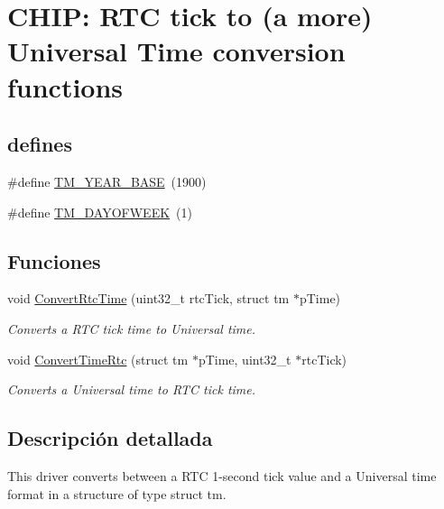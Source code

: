 \hypertarget{group___r_t_c___u_t}{}\section{C\+H\+IP\+: R\+TC tick to (a more) Universal Time conversion functions}
\label{group___r_t_c___u_t}
\subsection*{\textquotesingle{}defines\textquotesingle{}}
\begin{DoxyCompactItemize}
\item 
\#define \hyperlink{group___r_t_c___u_t_ga0b24352233a7c91b5e627d2a26ffefb3}{T\+M\+\_\+\+Y\+E\+A\+R\+\_\+\+B\+A\+SE}~(1900)
\item 
\#define \hyperlink{group___r_t_c___u_t_ga35e3274b0fe1e51c0dcbbac47b0ccd24}{T\+M\+\_\+\+D\+A\+Y\+O\+F\+W\+E\+EK}~(1)
\end{DoxyCompactItemize}
\subsection*{Funciones}
\begin{DoxyCompactItemize}
\item 
void \hyperlink{group___r_t_c___u_t_gab32979b30c7fb280248d6aecd3dccfab}{Convert\+Rtc\+Time} (uint32\+\_\+t rtc\+Tick, struct tm $\ast$p\+Time)
\begin{DoxyCompactList}\small\item\em Converts a R\+TC tick time to Universal time. \end{DoxyCompactList}\item 
void \hyperlink{group___r_t_c___u_t_ga4923243ffbb19299329003af866ca4bb}{Convert\+Time\+Rtc} (struct tm $\ast$p\+Time, uint32\+\_\+t $\ast$rtc\+Tick)
\begin{DoxyCompactList}\small\item\em Converts a Universal time to R\+TC tick time. \end{DoxyCompactList}\end{DoxyCompactItemize}


\subsection{Descripción detallada}
This driver converts between a R\+TC 1-\/second tick value and a Universal time format in a structure of type \textquotesingle{}struct tm\textquotesingle{}. 

